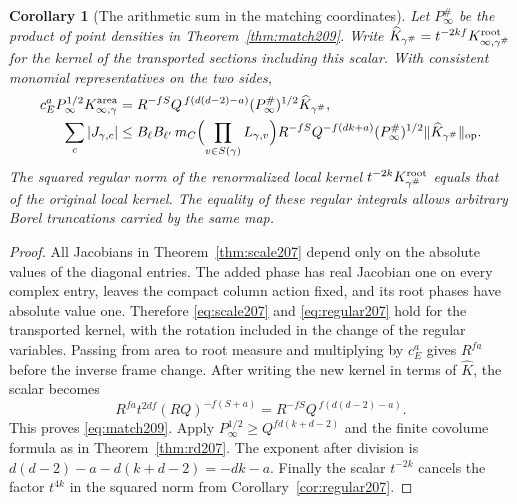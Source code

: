 \documentclass[a4paper,11pt]{article}
\newtheorem{corollary}[proposition]{Corollary}
\theoremstyle{definition}
\theoremstyle{remark}
\numberwithin{equation}{section}
\begin{document}
\begin{corollary}[The arithmetic sum in the matching coordinates]
\label{cor:match209}
Let \(P^\#_\infty\) be the product of point densities in
Theorem~\ref{thm:match209}. Write
\(\widehat K_{\gamma^\#}=t^{-2kf}K_{\infty,\gamma^\#}^{\rm root}\)
for the kernel of the transported sections including this scalar.
With consistent monomial representatives on the two sides,
\begin{align}
 c_E^a P_\infty^{1/2}K_{\infty,\gamma}^{\rm area}
    &=R^{-fS}Q^{\,f(d(d-2)-a)}
                           (P^\#_\infty)^{1/2}\widehat K_{\gamma^\#},
                                                        \label{eq:match209}\\
 \sum_c |J_{\gamma,c}|
    &\le B_\ell B_{\ell'}\,m_C
       \Bigl(\prod_{v\in S(\gamma)}L_{\gamma,v}\Bigr)
       R^{-fS}Q^{-f(dk+a)}
             (P^\#_\infty)^{1/2}\|\widehat K_{\gamma^\#}\|_{\rm op}.
                                                        \notag
\end{align}
The squared regular norm of the renormalized local kernel
\(t^{-2k}K_{\gamma^\#}^{\rm root}\) equals that of the
original local kernel. The equality of these regular integrals
allows arbitrary Borel truncations carried by the same map.
\end{corollary}
\begin{proof}
All Jacobians in Theorem~\ref{thm:scale207} depend only on the
absolute values of the diagonal entries. The added phase has
real Jacobian one on every complex entry, leaves the compact
column action fixed, and its root phases have absolute value one.
Therefore \eqref{eq:scale207} and \eqref{eq:regular207} hold for
the transported kernel, with the rotation included in the
change of the regular variables. Passing from area to root
measure and multiplying by \(c_E^a\) gives \(R^{fa}\) before
the inverse frame change. After writing the new kernel in terms
of \(\widehat K\), the scalar becomes
\[
 R^{fa}t^{2df}(RQ)^{-f(S+a)}
      =R^{-fS}Q^{\,f(d(d-2)-a)} .
\]
This proves \eqref{eq:match209}. Apply
\(P_\infty^{1/2}\ge Q^{fd(k+d-2)}\) and the finite covolume
formula as in Theorem~\ref{thm:rd207}. The exponent after
division is \(d(d-2)-a-d(k+d-2)=-dk-a\). Finally the scalar
\(t^{-2k}\) cancels the factor \(t^{4k}\) in the squared norm
from Corollary~\ref{cor:regular207}.
\end{proof}
\end{document}
